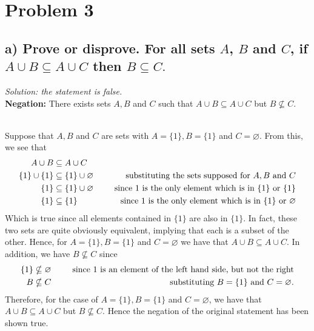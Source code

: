 \documentclass[11pt, letterpaper]{article}
\begin{document}
\section*{Problem 3}

\subsection*{a) Prove or disprove. For all sets $A$, $B$ and $C$, if $A\cup B \subseteq A \cup C$ then $B \subseteq C.$}
{\large\it Solution: the statement is false.}\\[0.25cm]
{\bf Negation:} There exists sets $A, B$ and $C$ such that $A\cup B \subseteq A \cup C$ but $B \nsubseteq C.$
\begin{prf}~\\
    Suppose that $A, B$ and $C$ are sets with $A=\{1\}, B=\{1\}$ and $C=\varnothing$. From this, we see that
    \begin{align*}
        A\cup B &\subseteq A \cup C\\
        \{1\}\cup \{1\} &\subseteq \{1\} \cup \varnothing &\text{\indent substituting the sets supposed for $A, B$ and $C$}\\
        \{1\} &\subseteq \{1\} \cup \varnothing &\text{\indent since 1 is the only element which is in $\{1\}$ or $\{1\}$}\\
        \{1\} &\subseteq \{1\} &\text{\indent since 1 is the only element which is in $\{1\}$ or $\varnothing$}
    \end{align*}
    Which is true since all elements contained in $\{1\}$ are also in $\{1\}$. In fact, these two sets are quite obviously equivalent, implying that each is a subset of the other. 
    Hence, for $A=\{1\}, B=\{1\}$ and $C=\varnothing$ we have that $A\cup B \subseteq A \cup C$.
    In addition, we have $B \nsubseteq C$ since
    \begin{align*}
        \{1\}&\nsubseteq \varnothing &\text{\indent since 1 is an element of the left hand side, but not the right}\\
        B&\nsubseteq C &\text{\indent substituting $B=\{1\}$ and $C=\varnothing$.}
    \end{align*}
    Therefore, for the case of $A=\{1\}, B=\{1\}$ and $C=\varnothing$, we have that $A\cup B \subseteq A \cup C$ but $B\nsubseteq C$. Hence the negation of the original statement has been shown true.
\end{prf}
\end{document}
